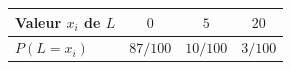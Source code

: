 \begingroup\renewcommand{\arraystretch}{1.35}
\begin{tabular}{@{}lccc@{}}\toprule
Valeur $x_i$ de $L$ & $0$ & $5$ & $20$\\\midrule
$P(L=x_i)$ & $87/100$ & $10/100$ & $3/100$\\
\bottomrule\end{tabular}\endgroup

\par\smallskip{}

